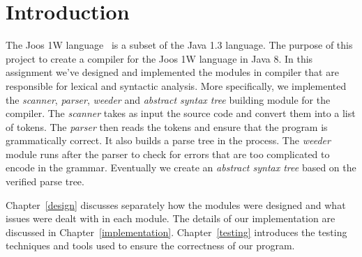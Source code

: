 \chapter{Introduction}

The Joos 1W language~\cite{joos1w} is a subset of the Java 1.3 language. The purpose of this project to create a compiler for the Joos 1W language in Java 8. In this assignment we've designed and implemented the modules in compiler that are responsible for lexical and syntactic analysis. More specifically, we implemented the \emph{scanner}, \emph{parser}, \emph{weeder} and \emph{abstract syntax tree} building module for the compiler. The \emph{scanner} takes as input the source code and convert them into a list of tokens. The \emph{parser} then reads the tokens and ensure that the program is grammatically correct. It also builds a parse tree in the process. The \emph{weeder} module runs after the parser to check for errors that are too complicated to encode in the grammar. Eventually we create an \emph{abstract syntax tree} based on the verified parse tree.

Chapter~\ref{design} discusses separately how the modules were designed and what issues were dealt with in each module. The details of our implementation are discussed in Chapter~\ref{implementation}. Chapter~\ref{testing} introduces the testing techniques and tools used to ensure the correctness of our program.
